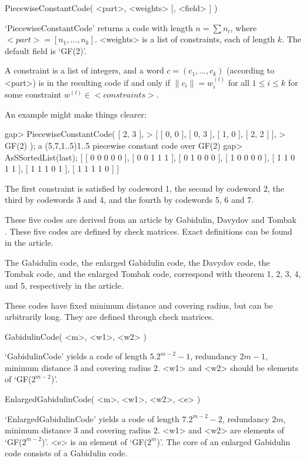 \>PiecewiseConstantCode( <part>, <weights> [, <field> ] )

`PiecewiseConstantCode' returns a code with length $n = \sum n_i$,  where
$<part>=[ n_1, \dots, n_k ]$. <weights> is a list of constraints, each of
length $k$. The default field is `GF(2)'.

A constraint is a list of integers, and
a word $c = ( c_1, \dots, c_k )$ (according to <part>)
is in the resulting code if and only if
$\|c_i\| = w_i^{(l)}$ for all $1 \leq i \leq k$
for some constraint $w^{(l)} \in <constraints>$.

An example might make things clearer:

\beginexample
gap> PiecewiseConstantCode( [ 2, 3 ],
> [ [ 0, 0 ], [ 0, 3 ], [ 1, 0 ], [ 2, 2 ] ],
> GF(2) );
a (5,7,1..5)1..5 piecewise constant code over GF(2)
gap> AsSSortedList(last);
[ [ 0 0 0 0 0 ], [ 0 0 1 1 1 ], [ 0 1 0 0 0 ], [ 1 0 0 0 0 ], [ 1 1 0 1 1 ], 
  [ 1 1 1 0 1 ], [ 1 1 1 1 0 ] ]
\endexample

The first constraint is satisfied by codeword 1,
the second by codeword 2,
the third by codewords 3 and 4,
and the fourth by codewords 5, 6 and 7.



These five codes are derived from an article by  Gabidulin,  Davydov  and
Tombak \cite{GDT91}. These five codes  are  defined  by  check  matrices.
Exact definitions can be found in the article.

The Gabidulin code, the enlarged Gabidulin code, the  Davydov  code,  the
Tombak code, and the enlarged Tombak code, correspond with theorem 1,  2,
3, 4, and 5, respectively in the article.

These codes have fixed minimum distance and covering radius, but  can  be
arbitrarily long. They are defined through check matrices.

\>GabidulinCode( <m>, <w1>, <w2> )

`GabidulinCode' yields a code of length $5 . 2^{m-2}-1$,
redundancy $2m-1$, minimum distance $3$ and covering radius $2$.
<w1> and <w2> should be elements of `GF($2^{m-2}$)'.

\>EnlargedGabidulinCode( <m>, <w1>, <w2>, <e> )

`EnlargedGabidulinCode' yields a code of length $7 . 2^{m-2}-2$,
redundancy $2m$, minimum distance $3$ and covering radius $2$.
<w1> and <w2> are elements of `GF($2^{m-2}$)'.
<e> is an element of `GF($2^m$)'.
The core of an enlarged Gabidulin code consists of a Gabidulin code.

